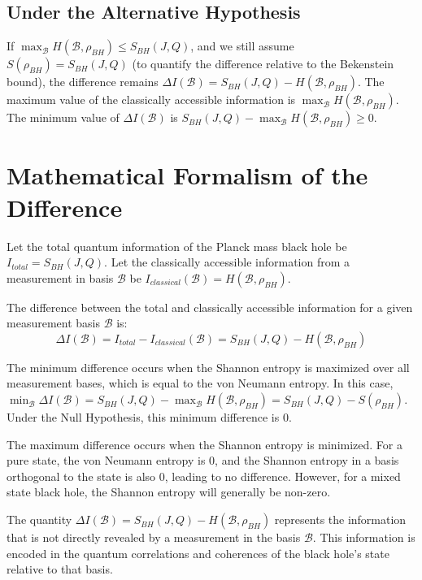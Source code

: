 \documentclass{article}
\theoremstyle{definition}
\begin{document}
	\subsection{Under the Alternative Hypothesis}
	If $\max_{\mathcal{B}} H(\mathcal{B}, \rho_{BH}) \le S_{BH}(J, Q)$, and we still assume $S(\rho_{BH}) = S_{BH}(J, Q)$ (to quantify the difference relative to the Bekenstein bound), the difference remains $\Delta I(\mathcal{B}) = S_{BH}(J, Q) - H(\mathcal{B}, \rho_{BH})$. The maximum value of the classically accessible information is $\max_{\mathcal{B}} H(\mathcal{B}, \rho_{BH})$. The minimum value of $\Delta I(\mathcal{B})$ is $S_{BH}(J, Q) - \max_{\mathcal{B}} H(\mathcal{B}, \rho_{BH}) \ge 0$.
	
	\section{Mathematical Formalism of the Difference}
	
	Let the total quantum information of the Planck mass black hole be $I_{total} = S_{BH}(J, Q)$.
	Let the classically accessible information from a measurement in basis $\mathcal{B}$ be $I_{classical}(\mathcal{B}) = H(\mathcal{B}, \rho_{BH})$.
	
	The difference between the total and classically accessible information for a given measurement basis $\mathcal{B}$ is:
	$$\Delta I(\mathcal{B}) = I_{total} - I_{classical}(\mathcal{B}) = S_{BH}(J, Q) - H(\mathcal{B}, \rho_{BH})$$
	
	The minimum difference occurs when the Shannon entropy is maximized over all measurement bases, which is equal to the von Neumann entropy. In this case, $\min_{\mathcal{B}} \Delta I(\mathcal{B}) = S_{BH}(J, Q) - \max_{\mathcal{B}} H(\mathcal{B}, \rho_{BH}) = S_{BH}(J, Q) - S(\rho_{BH})$. Under the Null Hypothesis, this minimum difference is 0.
	
	The maximum difference occurs when the Shannon entropy is minimized. For a pure state, the von Neumann entropy is 0, and the Shannon entropy in a basis orthogonal to the state is also 0, leading to no difference. However, for a mixed state black hole, the Shannon entropy will generally be non-zero.
	
	The quantity $\Delta I(\mathcal{B}) = S_{BH}(J, Q) - H(\mathcal{B}, \rho_{BH})$ represents the information that is not directly revealed by a measurement in the basis $\mathcal{B}$. This information is encoded in the quantum correlations and coherences of the black hole's state relative to that basis.
	
\end{document}
